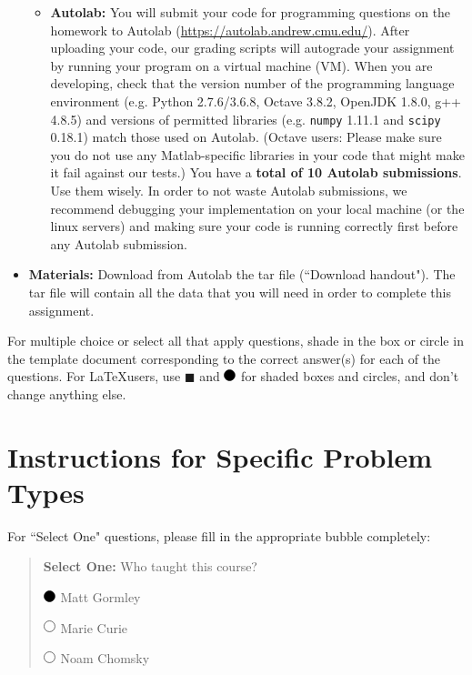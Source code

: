 \documentclass[11pt]{article}
\numberwithin{equation}{section} %
\numberwithin{figure}{section} %
\numberwithin{table}{section} %
\newcommand{\blackcircle}{\tikz\draw[black,fill=black] (0,0) circle (1ex);}
\renewcommand{\circle}{\tikz\draw[black] (0,0) circle (1ex);}
\begin{document}
\begin{itemize}
\begin{itemize}
  \item \textbf{Autolab:} You will submit your code for programming
    questions on the homework to Autolab
    (\url{https://autolab.andrew.cmu.edu/}). After uploading your code,
    our grading scripts will autograde your assignment by running your
    program on a virtual machine (VM). 
    When you are developing, check that the
    version number of the programming language environment
    (e.g. Python 2.7.6/3.6.8, Octave 3.8.2, OpenJDK 1.8.0, g++ 4.8.5) and
    versions of permitted libraries (e.g.  \texttt{numpy} 1.11.1 and \texttt{scipy} 0.18.1) 
    match those used on Autolab.
    (Octave users: Please make sure you do not use any
    Matlab-specific libraries in your code that might make it fail
    against our tests.)
    You have a {\bf total of 10 Autolab submissions}. Use them
    wisely. In order to not waste Autolab submissions, we recommend
    debugging your implementation on your local machine (or the linux
    servers) and making sure your code is running correctly first
    before any Autolab submission.

  \end{itemize}
  
\item\textbf{Materials:} Download from Autolab the tar file (``Download
  handout"). The tar file will contain all the data that you will need in order to complete this assignment.

\end{itemize}

For multiple choice or select all that apply questions, shade in the box or circle in the template document corresponding to the correct answer(s) for each of the questions. For \LaTeX users, use $\blacksquare$ and $\blackcircle$  for shaded boxes and circles, and don't change anything else.


\clearpage

\section*{Instructions for Specific Problem Types}

For ``Select One" questions, please fill in the appropriate bubble completely:

\begin{quote}
\textbf{Select One:} Who taught this course?
\begin{list}{}
     \item $\blackcircle$ Matt Gormley
     \item $\circle$ Marie Curie
     \item $\circle$ Noam Chomsky
\end{list}
\end{quote}
\end{document}
